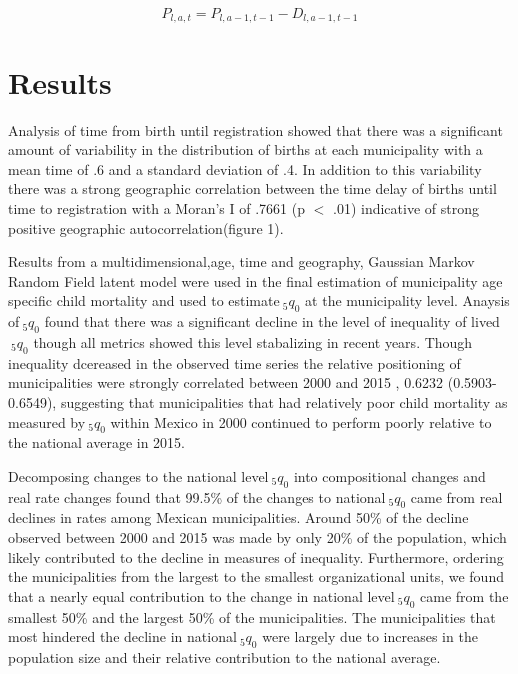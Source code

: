 \documentclass[a0,portrait]{a0poster}
\begin{document}
\begin{multicols}{2}
$$
P_{l,a,t} = P_{l,a-1,t-1} - D_{l,a-1,t-1}
$$



\section*{Results}

Analysis of time from birth until registration showed that there was a significant amount of variability in the distribution of births at each municipality with a mean time of .6  and a standard deviation of .4. In addition to this variability there was a strong geographic correlation between the time delay of births until time to registration with a Moran's I of .7661 (p $<$ .01) indicative of strong positive geographic autocorrelation(figure 1).

Results from a multidimensional,age, time and geography, Gaussian Markov Random Field latent model were used in the final estimation of municipality age specific child mortality and used to estimate$~_{5}q_{0}$ at the municipality level. Anaysis of$~_{5}q_{0}$ found that there was a significant decline in the level of inequality of lived$~_{5}q_{0}$ though all metrics showed this level stabalizing in recent years. Though inequality dcereased in the observed time series the relative positioning of municipalities were strongly correlated between 2000 and 2015 , 0.6232 (0.5903-0.6549), suggesting that municipalities that had relatively poor child mortality as measured by$~_{5}q_{0}$ within Mexico in 2000 continued to perform poorly relative to the national average in 2015.

Decomposing changes to the national level$~_{5}q_{0}$ into compositional changes and real rate changes found that 99.5\% of the changes to national$~_{5}q_{0}$ came from real declines in rates among Mexican municipalities. Around 50\% of the decline observed between 2000 and 2015 was made by only 20\% of the population, which likely contributed to the decline in measures of inequality. Furthermore, ordering the municipalities from the largest to the smallest organizational units, we found that a nearly equal contribution to the change in national level$~_{5}q_{0}$ came from the smallest 50\% and the largest 50\% of the municipalities. The municipalities that most hindered the decline in national$~_{5}q_{0}$ were largely due to increases in the population size and their relative contribution to the national average.



\end{multicols}
\end{document}
